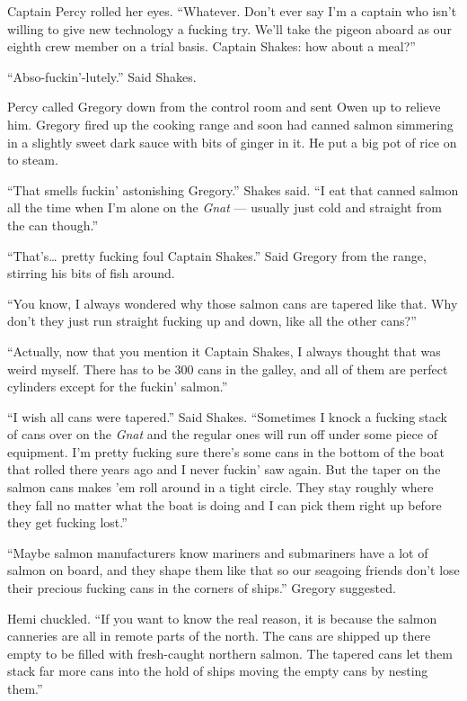 \documentclass[]{scrbook}
\begin{document}
Captain Percy rolled her eyes. ``Whatever. Don't ever say I'm a captain
who isn't willing to give new technology a fucking try. We'll take the
pigeon aboard as our eighth crew member on a trial basis. Captain
Shakes: how about a meal?''

``Abso-fuckin'-lutely.'' Said Shakes.

Percy called Gregory down from the control room and sent Owen up to
relieve him. Gregory fired up the cooking range and soon had canned
salmon simmering in a slightly sweet dark sauce with bits of ginger in
it. He put a big pot of rice on to steam.

``That smells fuckin' astonishing Gregory.'' Shakes said. ``I eat that
canned salmon all the time when I'm alone on the \emph{Gnat} --- usually
just cold and straight from the can though.''

``That's\ldots{} pretty fucking foul Captain Shakes.'' Said Gregory from
the range, stirring his bits of fish around.

``You know, I always wondered why those salmon cans are tapered like
that. Why don't they just run straight fucking up and down, like all the
other cans?''

``Actually, now that you mention it Captain Shakes, I always thought
that was weird myself. There has to be 300 cans in the galley, and all
of them are perfect cylinders except for the fuckin' salmon.''

``I wish all cans were tapered.'' Said Shakes. ``Sometimes I knock a
fucking stack of cans over on the \emph{Gnat} and the regular ones will
run off under some piece of equipment. I'm pretty fucking sure there's
some cans in the bottom of the boat that rolled there years ago and I
never fuckin' saw again. But the taper on the salmon cans makes 'em roll
around in a tight circle. They stay roughly where they fall no matter
what the boat is doing and I can pick them right up before they get
fucking lost.''

``Maybe salmon manufacturers know mariners and submariners have a lot of
salmon on board, and they shape them like that so our seagoing friends
don't lose their precious fucking cans in the corners of ships.''
Gregory suggested.

Hemi chuckled. ``If you want to know the real reason, it is because the
salmon canneries are all in remote parts of the north. The cans are
shipped up there empty to be filled with fresh-caught northern salmon.
The tapered cans let them stack far more cans into the hold of ships
moving the empty cans by nesting them.''
\end{document}
